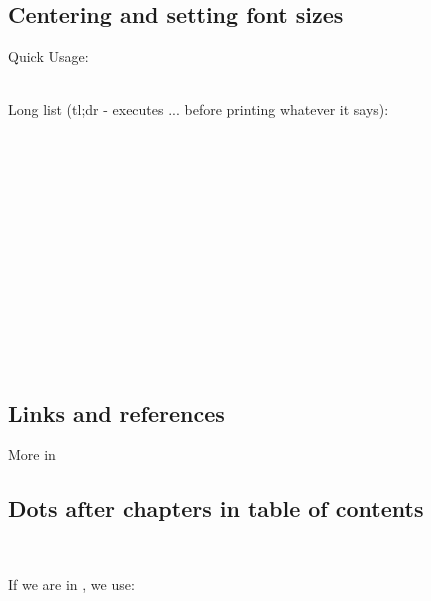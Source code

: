 \subsection{Centering and setting font sizes}
Quick Usage:\\
\begin{latex}
\usepackage{sectsty}
\chaptertitlefont{\centering\LARGE}
\sectionfont{\Large}
\end{latex}
\\
Long list (tl;dr - executes ... before printing whatever it says): \noncurs
\vspace{-11pt}
\begin{multicols}{2} \noindent
   \\
  \\
  \\
  \\
  \\
  \\
\columnbreak
  \\
  \\
  \\
  \\
  \\
  \\
\end{multicols}

\subsection{Links and references}
\begin{latex}
\usepackage{hyperref}
\hypersetup{colorlinks=true, linkcolor=cyan, citecolor=green,
  filecolor=black, urlcolor=blue}
\end{latex}
More in 

\subsection{Dots after chapters in table of contents}
\\
\code{\renewcommand{\cftchapleader}{\cftdotfill{\cftdotsep}}}

If we are in \article, we use:\\
\code{\renewcommand{\cftsecleader}{\cftdotfill{\cftdotsep}}}


